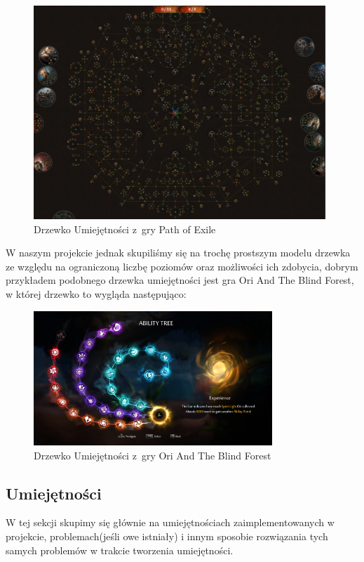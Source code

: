\documentclass[oneside,polski,logo]{amuthesis}
\begin{document}
\begin{figure}[h]
	\centering
	\includegraphics[width=11cm]{images/kozubal/poe.png}
	\caption{Drzewko Umiejętności z~gry Path of Exile \cite{poeskills} }
\end{figure}
\newpage
W naszym projekcie jednak skupiliśmy się na trochę prostszym modelu drzewka ze względu na ograniczoną liczbę poziomów oraz możliwości ich zdobycia, dobrym przykładem podobnego drzewka umiejętności jest gra Ori And The Blind Forest, w której drzewko to wygląda następująco:

\begin{figure}[h]
	\centering
	\includegraphics[width=9cm]{images/kozubal/ori.jpg}
	\caption{Drzewko Umiejętności z~gry Ori And The Blind Forest}
\end{figure}
\subsection{Umiejętności}
W tej sekcji skupimy się głównie na umiejętnościach zaimplementowanych w projekcie, problemach(jeśli owe istniały) i innym sposobie rozwiązania tych samych problemów w trakcie tworzenia umiejętności.
\end{document}
